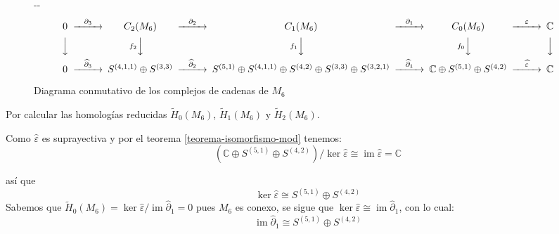\documentclass[12pt]{book}
\newlength{\offsetpage}
\newenvironment{widepage}{\begin{adjustwidth}{-\offsetpage}{-\offsetpage}%
    \addtolength{\textwidth}{2\offsetpage}}%
{\end{adjustwidth}}
\theoremstyle{definition}
\DeclareMathOperator{\im}{im}
\newcounter{in}
\begin{document}
  \begin{figure}[h]
    \centering
    \begin{widepage}
      \scriptsize{
        \[
        \begin{CD}
          0 @>{\partial_{3}}>> C_{2}(M_{6}) @>{\partial_{2}}>> C_{1}(M_{6}) @>{\partial_{1}}>> C_{0}(M_{6}) @>{\varepsilon}>> \mathbb{C}\\
          @VVV @Vf_{2}VV   @Vf_{1}VV  @Vf_{0}VV  @VVV    \\
          0 @>{\widehat\partial_{3}}>> S^{(4,1,1)}\oplus S^{(3,3)}
          @>{\widehat\partial_{2}}>> S^{(5,1)}\oplus S^{(4,1,1)}\oplus
          S^{(4,2)}\oplus S^{(3,3)}\oplus S^{(3,2,1)}
          @>{\widehat\partial_{1}}>> \mathbb{C} \oplus S^{(5,1)}\oplus
          S^{(4,2)} @>{\widehat \varepsilon}>> \mathbb{C}
        \end{CD}
        \]
      }
    \end{widepage}
\caption{Diagrama conmutativo de los complejos de cadenas de $M_{6}$}
\label{fig:diagrama-conmutativo6}
\end{figure}

Por calcular las homologías reducidas $\widetilde
H_{0}(M_{6})$, $\widetilde H_{1}(M_{6})$ y $\widetilde H_{2}(M_{6})$.

Como $\widehat\varepsilon$ es suprayectiva y por el teorema \ref{teorema-isomorfismo-mod} tenemos:
\begin{equation*}
  (\mathbb{C} \oplus S^{(5,1)}\oplus S^{(4,2)})/\ker\widehat\varepsilon\cong \im \widehat\varepsilon=\mathbb{C}
\end{equation*}

así que
\begin{equation*}
  \label{ker0-M6}
  \ker\widehat\varepsilon\cong  S^{(5,1)}\oplus S^{(4,2)} 
\end{equation*}
Sabemos que $\widetilde H_{0}(M_{6})=\ker \widehat\varepsilon/\im
\widehat\partial_{1}=0$ pues $M_{6}$ es conexo, se sigue que $\ker \widehat\varepsilon\cong
\im\widehat\partial_{1}$, con lo cual:
\begin{equation}
  \label{im1-M6}
  \im \widehat\partial_{1}\cong  S^{(5,1)}\oplus S^{(4,2)} 
\end{equation}
\end{document}
